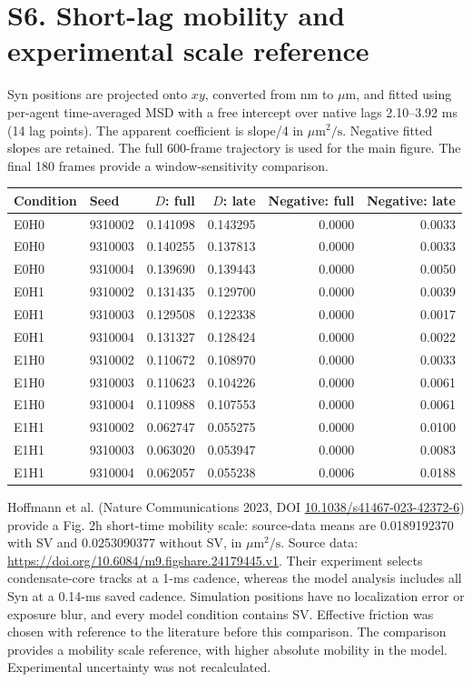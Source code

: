 \documentclass[11pt,letterpaper]{article}
\begin{document}
\section*{S6. Short-lag mobility and experimental scale reference}
Syn positions are projected onto $xy$, converted from nm to $\mu$m,
and fitted using per-agent time-averaged MSD with a free intercept over
native lags 2.10--3.92 ms (14 lag points). The apparent coefficient is
slope/4 in $\mu\mathrm m^2/\mathrm s$. Negative fitted slopes are retained.
The full 600-frame trajectory is used for the main figure. The final
180 frames provide a window-sensitivity comparison.
\begin{center}\small
\begin{tabular}{llrrrr}
\toprule
Condition & Seed & $D$: full & $D$: late & Negative: full & Negative: late \\ \midrule
E0H0 & 9310002 & 0.141098 & 0.143295 & 0.0000 & 0.0033 \\
E0H0 & 9310003 & 0.140255 & 0.137813 & 0.0000 & 0.0033 \\
E0H0 & 9310004 & 0.139690 & 0.139443 & 0.0000 & 0.0050 \\
E0H1 & 9310002 & 0.131435 & 0.129700 & 0.0000 & 0.0039 \\
E0H1 & 9310003 & 0.129508 & 0.122338 & 0.0000 & 0.0017 \\
E0H1 & 9310004 & 0.131327 & 0.128424 & 0.0000 & 0.0022 \\
E1H0 & 9310002 & 0.110672 & 0.108970 & 0.0000 & 0.0033 \\
E1H0 & 9310003 & 0.110623 & 0.104226 & 0.0000 & 0.0061 \\
E1H0 & 9310004 & 0.110988 & 0.107553 & 0.0000 & 0.0061 \\
E1H1 & 9310002 & 0.062747 & 0.055275 & 0.0000 & 0.0100 \\
E1H1 & 9310003 & 0.063020 & 0.053947 & 0.0000 & 0.0083 \\
E1H1 & 9310004 & 0.062057 & 0.055238 & 0.0006 & 0.0188 \\
\bottomrule\end{tabular}\end{center}
Hoffmann et al. (Nature Communications 2023, DOI
\href{https://doi.org/10.1038/s41467-023-42372-6}{10.1038/s41467-023-42372-6})
provide a Fig. 2h short-time mobility scale: source-data means are
0.0189192370 with SV and 0.0253090377 without SV, in
$\mu\mathrm m^2/\mathrm s$. Source data:
\url{https://doi.org/10.6084/m9.figshare.24179445.v1}.
Their experiment selects condensate-core tracks at a 1-ms cadence,
whereas the model analysis includes all Syn at a 0.14-ms saved cadence.
Simulation positions have no localization error or exposure blur, and
every model condition contains SV. Effective friction was chosen with
reference to the literature before this comparison. The comparison provides a mobility scale reference, with higher absolute
mobility in the model. Experimental uncertainty was not recalculated.
\end{document}
